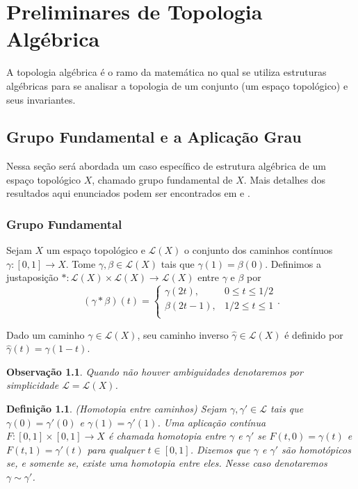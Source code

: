 \documentclass[12pt]{book}
\newtheorem{definicao}[teorema]{Definição}
\newtheorem{observacao}[teorema]{Observação}
\newcommand{\caminhos}{\mathcal{L}}
\newcommand{\caminhossempontobase}[1]{\caminhos(#1)}
\newcommand{\funcaocond}[5]{
	#1 = 
	\left\{
	\begin{array}{cc}
		#2, & #3\\
		#4, & #5\\
	\end{array}
	\right.
}
\newcommand{\intervalo}{[0,1]}
\begin{document}
	
	\chapter{Preliminares de Topologia Algébrica}
	A topologia algébrica é o ramo da matemática no qual se utiliza estruturas algébricas para se analisar a topologia de um conjunto (um espaço topológico) e seus invariantes. 
	
	\section{Grupo Fundamental e a Aplicação Grau}\label{capitulo_grupo_fundamental}
	Nessa seção será abordada um caso específico de estrutura algébrica de um espaço topológico $X$, chamado grupo fundamental de $X$. Mais detalhes dos resultados aqui enunciados podem ser encontrados em \cite{elon_grupo_fundamental} e \cite{massey}.
	
	\subsection{Grupo Fundamental}
	
	Sejam $X$ um espaço topológico e $\caminhossempontobase{X}$ o conjunto dos caminhos contínuos $\gamma:[0,1]\to X$. Tome $\gamma, \beta \in \caminhossempontobase{X}$ tais que $\gamma(1) = \beta(0)$. Definimos a justaposição $*:\caminhossempontobase{X}\times \caminhossempontobase{X} \to \caminhossempontobase{X}$ entre $\gamma$ e $\beta$ por
	$$
	\funcaocond{(\gamma*\beta)(t)}{\gamma(2t)}{0\leq t \leq 1/2}{\beta(2t-1)}{1/2 \leq t \leq 1}.
	$$
	
	Dado um caminho $\gamma\in \caminhossempontobase{X}$, seu caminho inverso $\hat{\gamma} \in \caminhossempontobase{X}$ é definido por $\hat{\gamma} (t) = \gamma(1-t)$.
	
	\begin{observacao}
		Quando não houver ambiguidades denotaremos por simplicidade $\caminhos=\caminhossempontobase{X}$.
	\end{observacao}
	
	\begin{definicao}\label{definicao_caminhos_homotopicos}
		(Homotopia entre caminhos) Sejam $\gamma, \gamma' \in \caminhos$ tais que $\gamma(0)=\gamma'(0)$ e $\gamma(1)=\gamma'(1)$. Uma aplicação contínua $F:\intervalo \times \intervalo \to X$ é chamada homotopia entre $\gamma$ e $\gamma'$ se $F(t, 0) = \gamma(t)$ e $F(t, 1) = \gamma'(t)$ para qualquer $t\in \intervalo$. Dizemos que  $\gamma$ e $\gamma'$ são homotópicos se, e somente se, existe uma homotopia entre eles. Nesse caso denotaremos $\gamma \sim \gamma'$. 
	\end{definicao}
	
\end{document}
